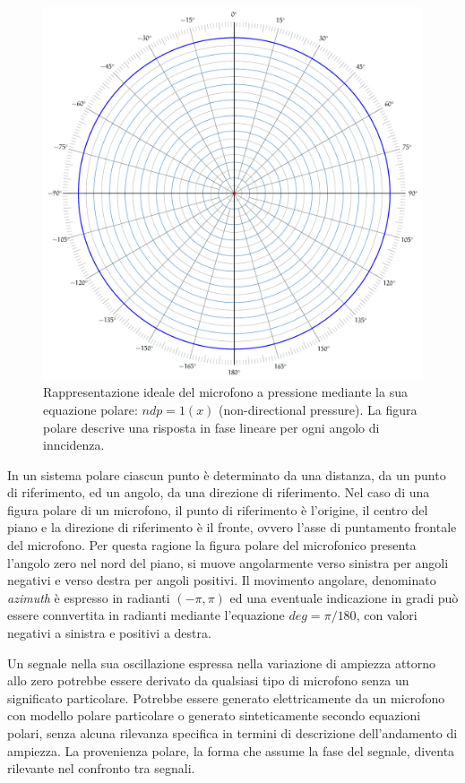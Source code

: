 \begin{figure}[t]
\centering
\includegraphics[width=1\columnwidth]{CAPITOLI/_TIKZ/POLAR/omni}
\caption{Rappresentazione ideale del microfono a pressione mediante la sua
equazione polare: $ndp = 1(x)$ (non-directional pressure). La figura polare
descrive una risposta in fase lineare per ogni angolo di inncidenza.}
\label{polar:omni}
\end{figure}

In un sistema polare ciascun punto è
determinato da una distanza, da un punto di riferimento, ed un angolo, da una
direzione di riferimento. Nel caso di una figura polare di un microfono, il
punto di riferimento è l'origine, il centro del piano e la direzione di
riferimento è il fronte, ovvero l'asse di puntamento frontale del microfono. Per
questa ragione la figura polare del microfonico presenta l'angolo zero
nel nord del piano, si muove angolarmente verso sinistra per angoli
negativi e verso destra per angoli positivi. Il movimento angolare, denominato
\emph{azimuth} è espresso in radianti $(-\pi,\pi)$ ed una eventuale indicazione in
gradi può essere connvertita in radianti mediante l'equazione $deg = \pi/180$,
con valori negativi a sinistra e positivi a destra.

Un segnale nella sua oscillazione espressa nella variazione di ampiezza
attorno allo zero potrebbe essere derivato da qualsiasi tipo di microfono senza
un significato particolare. Potrebbe essere generato elettricamente da un
microfono con modello polare particolare o generato sinteticamente secondo equazioni polari, senza
alcuna rilevanza specifica in termini di descrizione dell'andamento di ampiezza.
La provenienza polare, la forma che assume la fase del segnale, diventa rilevante nel confronto tra segnali.

